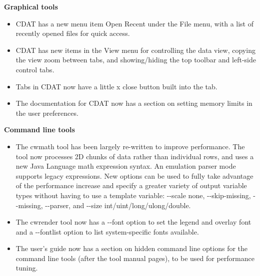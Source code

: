 \hspace{0.4cm} {\bf Graphical tools}
\begin{itemize}

  \item CDAT has a new menu item {\gui Open Recent} under the {\gui File} menu,
  with a list of recently opened files for quick access.

  \item CDAT has new items in the {\gui View} menu for controlling the data
  view, copying the view zoom between tabs, and showing/hiding the top toolbar
  and left-side control tabs.

  \item Tabs in CDAT now have a little x close button built into the tab.

  \item The documentation for CDAT now has a section on setting memory limits
  in the user preferences.

\end{itemize}

\hspace{0.4cm} {\bf Command line tools}
\begin{itemize}

  \item The cwmath tool has been largely re-written to improve performance.
  The tool now processes 2D chunks of data rather than individual rows, and
  uses a new Java Language math expression syntax.  An emulation parser mode
  supports legacy expressions.  New options can be used to fully take advantage
  of the performance increase and specify a greater variety of output variable
  types without having to use a template variable: -{-}scale none,
  -{-}skip-missing, -{-}missing, -{-}parser, and -{-}size int/uint/long/ulong/double.

  \item The cwrender tool now has a -{-}font option to set the legend and overlay
  font and a -{-}fontlist option to list system-specific fonts available.

  \item The user's guide now has a section on hidden command line options for
  the command line tools (after the tool manual pages), to be used for
  performance tuning.

\end{itemize}

